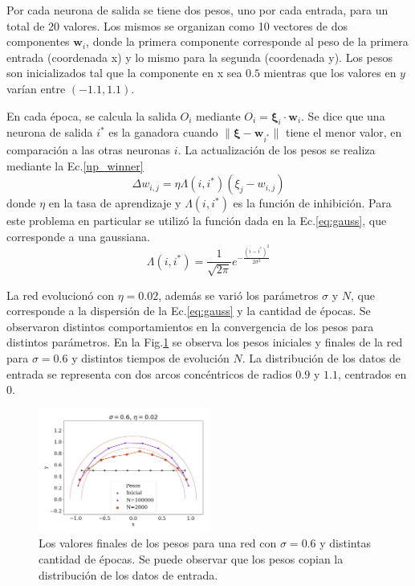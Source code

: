 Por cada neurona de salida se tiene dos pesos, uno por cada entrada, para un total de 20 valores. Los mismos se organizan como 10 vectores de dos componentes $\bm w_i$, donde la primera componente corresponde al peso de la primera entrada (coordenada x) y lo mismo para la segunda (coordenada y). Los pesos son inicializados tal que la componente en x sea $0.5$ mientras que los valores en $y$ varían entre $(-1.1, 1.1)$.

En cada época, se calcula la salida $O_i$ mediante $O_i = \bm \xi_i \cdot \bm w_i$. Se dice que una neurona de salida $i^*$ es la ganadora cuando $\| \bm \xi - \bm w_{i^*} \|$ tiene el menor valor, en comparación a las otras neuronas $i$. La actualización de los pesos se realiza mediante la Ec.\ref{up_winner}
\begin{equation}
	\Delta w_{i,j} = \eta \Lambda(i, i^*) (\xi_j - w_{i,j})
	\label{up_winner}
\end{equation}
donde $\eta$ en la tasa de aprendizaje y  $\Lambda(i, i^*) $ es la función de inhibición. Para este problema en particular se utilizó la función dada en la Ec.\ref{eq:gauss}, que corresponde a una gaussiana.
\begin{equation}
	\Lambda(i, i^*) = \frac{1}{\sqrt{2\pi}}e^{-\frac{(i-i^*)^2}{2\sigma^2}} \label{eq:gauss}
\end{equation}

La red evolucionó con $\eta=0.02$, además se varió los parámetros $\sigma$ y  $N$, que corresponde a la dispersión de la Ec.\ref{eq:gauss} y la cantidad de épocas.  Se  observaron distintos comportamientos en la convergencia de los pesos para distintos parámetros. En la Fig.\ref{fig:sigma0_6} se observa los pesos iniciales y finales de la red para $\sigma= 0.6$  y distintos tiempos de evolución $N$. La distribución de los datos de entrada se representa con dos arcos concéntricos de radios $0.9$  y $1.1$, centrados en 0. 
\begin{figure}[H]
	\centering
	\includegraphics[width=0.5\textwidth]{../Graficos/sigma0_6eta0_02.png}
	\caption{Los valores finales de los pesos para una red con $\sigma=0.6$ y distintas cantidad de épocas. Se puede observar que los pesos copian la distribución de los datos de entrada.}
	\label{fig:sigma0_6}
\end{figure}


